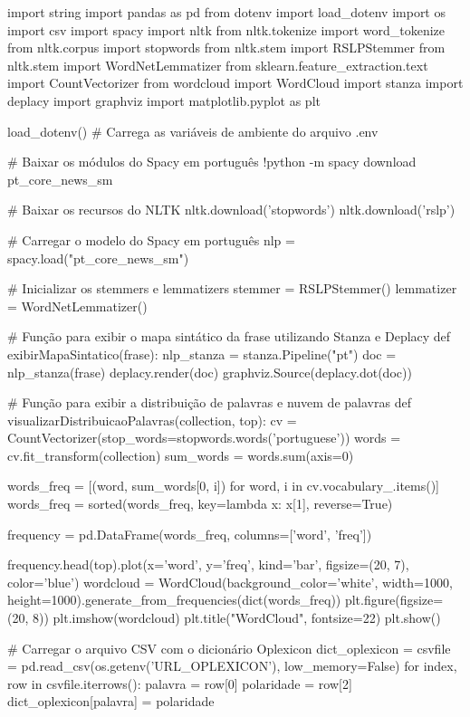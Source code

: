 \begin{codigo}[caption={Código de treinamento para análise de sentimento}, label={codigo:lex_train}, language=Python, breaklines=true]
import string
import pandas as pd
from dotenv import load_dotenv
import os
import csv
import spacy
import nltk
from nltk.tokenize import word_tokenize
from nltk.corpus import stopwords
from nltk.stem import RSLPStemmer
from nltk.stem import WordNetLemmatizer
from sklearn.feature_extraction.text import CountVectorizer
from wordcloud import WordCloud
import stanza
import deplacy
import graphviz
import matplotlib.pyplot as plt

load_dotenv()  # Carrega as variáveis de ambiente do arquivo .env

# Baixar os módulos do Spacy em português
!python -m spacy download pt_core_news_sm

# Baixar os recursos do NLTK
nltk.download('stopwords')
nltk.download('rslp')

# Carregar o modelo do Spacy em português
nlp = spacy.load("pt_core_news_sm")

# Inicializar os stemmers e lemmatizers
stemmer = RSLPStemmer()
lemmatizer = WordNetLemmatizer()

# Função para exibir o mapa sintático da frase utilizando Stanza e Deplacy
def exibirMapaSintatico(frase):
  nlp_stanza = stanza.Pipeline("pt")
  doc = nlp_stanza(frase)
  deplacy.render(doc)
  graphviz.Source(deplacy.dot(doc))

# Função para exibir a distribuição de palavras e nuvem de palavras
def visualizarDistribuicaoPalavras(collection, top):
  cv = CountVectorizer(stop_words=stopwords.words('portuguese'))
  words = cv.fit_transform(collection)
  sum_words = words.sum(axis=0)

  words_freq = [(word, sum_words[0, i]) for word, i in cv.vocabulary_.items()]
  words_freq = sorted(words_freq, key=lambda x: x[1], reverse=True)

  frequency = pd.DataFrame(words_freq, columns=['word', 'freq'])

  frequency.head(top).plot(x='word', y='freq', kind='bar', figsize=(20, 7), color='blue')
  wordcloud = WordCloud(background_color='white', width=1000, height=1000).generate_from_frequencies(dict(words_freq))
  plt.figure(figsize=(20, 8))
  plt.imshow(wordcloud)
  plt.title("WordCloud", fontsize=22)
  plt.show()

# Carregar o arquivo CSV com o dicionário Oplexicon
dict_oplexicon = {}
csvfile = pd.read_csv(os.getenv('URL_OPLEXICON'), low_memory=False)
for index, row in csvfile.iterrows():
  palavra = row[0]
  polaridade = row[2]
  dict_oplexicon[palavra] = polaridade


\end{codigo}
